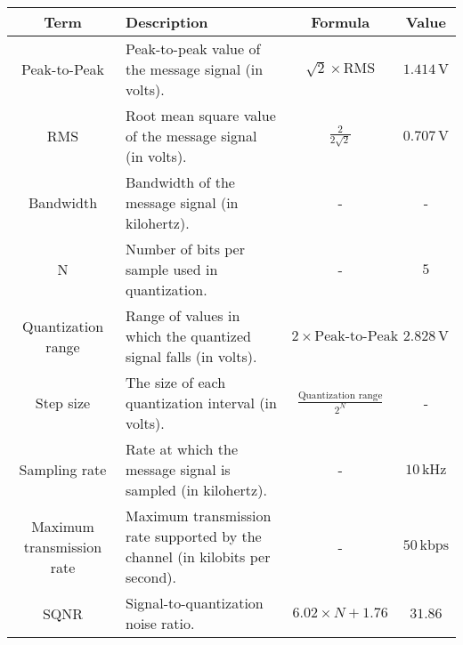 

\begin{center}
\begin{tabular}{|c|p{6cm}|c|c|}
\hline
\textbf{Term} & \textbf{Description} & \textbf{Formula} & \textbf{Value} \\
\hline
Peak-to-Peak & Peak-to-peak value of the message signal (in volts). & $\sqrt{2} \times \text{RMS}$ & $1.414 \, \text{V}$ \\
\hline
RMS & Root mean square value of the message signal (in volts). & $\frac{2}{2\sqrt{2}}$ & $0.707 \, \text{V}$ \\
\hline
Bandwidth & Bandwidth of the message signal (in kilohertz). & - & - \\
\hline
N & Number of bits per sample used in quantization. & - & $5$ \\
\hline
Quantization range & Range of values in which the quantized signal falls (in volts). & $2 \times \text{Peak-to-Peak}$ & $2.828 \, \text{V}$ \\
\hline
Step size & The size of each quantization interval (in volts). & $\frac{\text{Quantization range}}{2^N}$ & - \\
\hline
Sampling rate & Rate at which the message signal is sampled (in kilohertz). & - & $10 \, \text{kHz}$ \\
\hline
Maximum transmission rate & Maximum transmission rate supported by the channel (in kilobits per second). & - & $50 \, \text{kbps}$ \\
\hline
SQNR & Signal-to-quantization noise ratio. & $6.02 \times N + 1.76$ & $31.86$ \\
\hline
\end{tabular}
\end{center}

